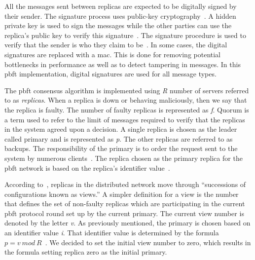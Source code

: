 All the messages sent between replicas are expected to be digitally signed by their sender. The signature process uses public-key cryptography~\cite[p.~257,p.267]{BOOK:BuildDepDistSyst}. A hidden private key is used to sign the messages while the other parties can use the replica's public key to verify this signature~\cite[p.~417]{PAPER:PBFTRecovery}. The signature procedure is used to verify that the sender is who they claim to be~\cite[p.~3]{PAPER:OGPBFT}. In some cases, the digital signatures are replaced with a \ac{mac}. This is done for removing potential bottlenecks in performance as well as to detect tampering in messages\cites{Web:UnderpBFT}[p.~257]{BOOK:BuildDepDistSyst}[p.~3,8]{PAPER:OGPBFT}. In this \ac{pbft} implementation, digital signatures are used for all message types.
\fi

The \ac{pbft} consensus algorithm is implemented using \emph{R} number of servers referred to as \emph{replicas}. When a replica is down or behaving maliciously, then we say that the replica is faulty. The number of faulty replicas is represented as \emph{f}.
Quorum is a term used to refer to the limit of messages required to verify that the replicas in the system agreed upon a decision\cites[p.~408-409]{PAPER:PBFTRecovery}[p.~2]{PAPER:DPBFT}.
A single replica is chosen as the leader called primary and is represented as \emph{p}. The other replicas are referred to as backups. The responsibility of the primary is to order the request sent to the system by numerous clients~\cites[p.~456]{BOOK:MVstandver3}[p.~405]{PAPER:PBFTRecovery}. The replica chosen as the primary replica for the \ac{pbft} network is based on the replica’s identifier value~\cite[p.~258]{BOOK:BuildDepDistSyst}.

According to~\cites[p.~3]{PAPER:OGPBFT}[p.~405]{PAPER:PBFTRecovery}, replicas in the distributed network move through “successions of configurations known as views.” A simpler definition for a view is the number that defines the set of non-faulty replicas which are participating in the current \ac{pbft} protocol round set up by the current primary. The current view number is denoted by the letter \emph{v}.
As previously mentioned, the primary is chosen based on an identifier value \emph{i}. That identifier value is determined by the formula $p = v ~mod~ R$~\cites{SLIDES:PBFT}[p.~258]{BOOK:BuildDepDistSyst}[p.~3]{PAPER:OGPBFT}.
We decided to set the initial view number to zero, which results in the formula setting replica zero as the initial primary.

